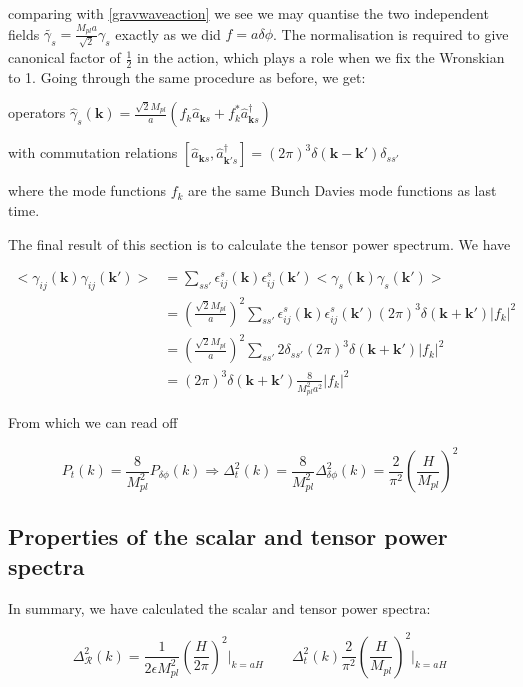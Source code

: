 \documentclass[a4paper,11pt]{article}
\renewcommand{\v}[1]{\mathbf{#1}}
\newcommand{\Mp}{M_{pl}}
\newcommand{\half}{\frac{1}{2}}
\newcommand{\anns}[2]{\hat{a}_{\v{#1}#2}}
\newcommand{\cres}[2]{\hat{a}^\dagger_{\v{#1}#2}}
\begin{document}
comparing with \ref{gravwaveaction} we see we may quantise the two independent fields $\tilde{\gamma_s} = \frac{\Mp a}{\sqrt{2}} \gamma_s$ exactly as we did $ f = a \delta \phi$. The normalisation is required to give canonical factor of $\half$ in the action, which plays a role when we fix the Wronskian to 1. Going through the same procedure as before, we get:

operators $\hat{\gamma}_s(\v{k}) = \frac{\sqrt{2}\Mp}{a}(f_k\anns{k}{s}+f_k^*\cres{k}{s})$

with commutation relations $[\anns{k}{s},\cres{k'}{s}] = (2\pi)^3\delta(\v{k}-\v{k'})\delta_{ss'}$

where the mode functions $f_k$ are the same Bunch Davies mode functions as last time.


The final result of this section is to calculate the tensor power spectrum. 
We have

\begin{align}
<\gamma_{ij}(\v{k})\gamma_{ij}(\v{k'})> & = \sum_{ss'} \epsilon^s_{ij}(\v{k})\epsilon^s_{ij}(\v{k'})<\gamma_{s}(\v{k})\gamma_{s}(\v{k'})>\\
&= (\frac{\sqrt{2}\Mp}{a})^2 \sum_{ss'} \epsilon^s_{ij}(\v{k})\epsilon^s_{ij}(\v{k'})(2\pi)^3\delta(\v{k}+\v{k'})|f_k|^2\\
&= (\frac{\sqrt{2}\Mp}{a})^2 \sum_{ss'} 2\delta_{ss'}(2\pi)^3\delta(\v{k}+\v{k'})|f_k|^2\\
&= (2\pi)^3\delta(\v{k}+\v{k'})\frac{8}{\Mp^2a^2}|f_k|^2
\end{align}

From which we can read off 

\begin{equation}
P_t(k)=\frac{8}{\Mp^2}P_{\delta\phi}(k) \Rightarrow \Delta^2_t(k)=\frac{8}{\Mp^2}\Delta^2_{\delta\phi}(k) = \frac{2}{\pi^2}(\frac{H}{\Mp})^2
\end{equation}


\subsection{Properties of the scalar and tensor power spectra}

In summary, we have calculated the scalar and tensor power spectra:

\begin{equation}
\Delta^2_{\mathcal{R}}(k) = \frac{1}{2\epsilon\Mp^2}(\frac{H}{2\pi})^2\rvert_{k=aH} \qquad
\Delta^2_t(k)\frac{2}{\pi^2}(\frac{H}{\Mp})^2\rvert_{k=aH}
\end{equation}
\end{document}
